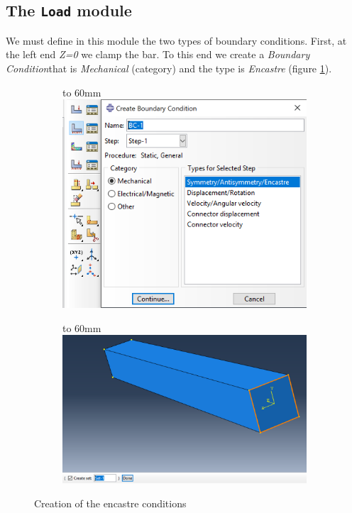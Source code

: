 \documentclass[spanish,a4paper,12pt]{article}
\def\imagebox#1#2{\vtop to #1{\null\hbox{#2}\vfill}}
\begin{document}
\clearpage
\subsection{The \texttt{Load} module}
We must define in this module the two types of boundary conditions. First, at the left end \emph{Z=0} we clamp the bar. To this end we create a \emph{Boundary Condition}that is \emph{Mechanical} (category) and the type is \emph{Encastre} (figure \ref{fig:load1}).

\begin{figure}[h!tp]
\centering
\captionsetup[subfigure]{justification=centering,singlelinecheck=false}
  \begin{subfigure}[b]{0.4\textwidth}
  \hspace{0mm}
    \imagebox{60mm}{\includegraphics[scale=0.4]{capturas/load1.png}}
  \end{subfigure}
  \begin{subfigure}[b]{0.59\textwidth}
  \hspace{1mm}
    \imagebox{60mm}{\includegraphics[scale=0.35]{capturas/load2.png}}
  \end{subfigure}
\caption{Creation of the encastre conditions}
\label{fig:load1}
\end{figure}
\end{document}
